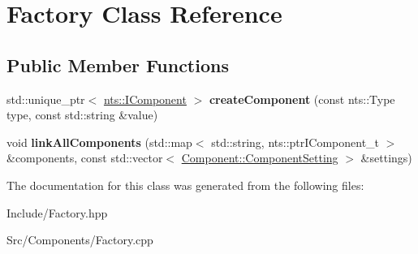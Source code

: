 \hypertarget{classFactory}{}\section{Factory Class Reference}
\label{classFactory}
\subsection*{Public Member Functions}
\begin{DoxyCompactItemize}
\item 
\mbox{\label{classFactory_a79d88109234e117dbaf4c1a7815cf8d8}} 
std\+::unique\+\_\+ptr$<$ \mbox{\hyperlink{classnts_1_1IComponent}{nts\+::\+I\+Component}} $>$ {\bfseries create\+Component} (const nts\+::\+Type type, const std\+::string \&value)
\item 
\mbox{\label{classFactory_a72b2647bfa6c5da1bc8cc3a43014ca69}} 
void {\bfseries link\+All\+Components} (std\+::map$<$ std\+::string, nts\+::ptr\+I\+Component\+\_\+t $>$ \&components, const std\+::vector$<$ \mbox{\hyperlink{structComponent_1_1ComponentSetting}{Component\+::\+Component\+Setting}} $>$ \&settings)
\end{DoxyCompactItemize}


The documentation for this class was generated from the following files\+:\begin{DoxyCompactItemize}
\item 
Include/Factory.\+hpp\item 
Src/\+Components/Factory.\+cpp\end{DoxyCompactItemize}
